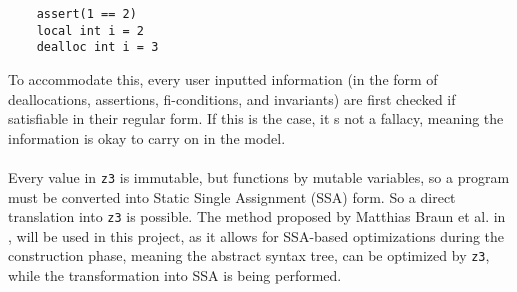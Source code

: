 \begin{lstlisting}
    assert(1 == 2)
    local int i = 2
    dealloc int i = 3
\end{lstlisting}
\noindent
To accommodate this, every user inputted information (in the form of deallocations, assertions,
fi-conditions, and invariants) are first checked if satisfiable in their regular form. If this is
the case, it s not a fallacy, meaning the information is okay to carry on in the model.
\\
\\
Every value in \texttt{z3} is immutable, but \lan functions by mutable variables, so a \lan program
must be converted into Static Single Assignment (SSA) form. So a direct translation into
\texttt{z3} is possible. The method proposed by Matthias Braun et al. in \cite{SSA}, will be used
in this project, as it allows for SSA-based optimizations during the construction phase, meaning
the abstract syntax tree, can be optimized by \texttt{z3}, while the transformation into SSA is
being performed.


